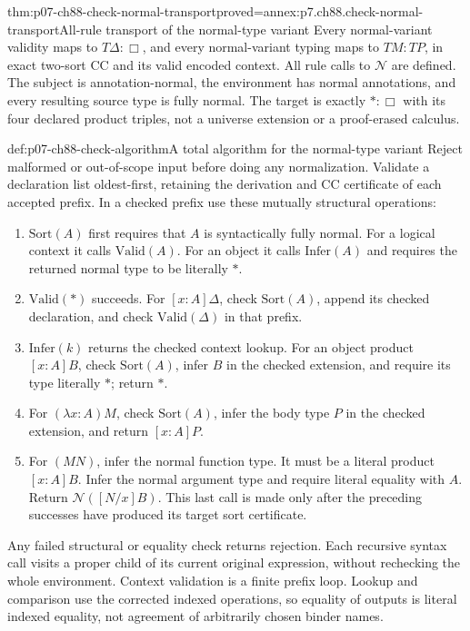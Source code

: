 

\begin{hbtheorem}{thm:p07-ch88-check-normal-transport}{proved=annex:p7.ch88.check-normal-transport}{All-rule transport of the normal-type variant}
Every normal-variant validity maps to \(T\Delta:\Box\), and every
normal-variant typing maps to \(TM:TP\), in exact two-sort CC and its
valid encoded context. All rule calls to \(\mathcal N\) are defined.
The subject is annotation-normal, the environment has normal annotations,
and every resulting source type is fully normal.
The target is exactly \(\ast:\Box\) with its four declared product
triples, not a universe extension or a proof-erased calculus.
\end{hbtheorem}

\begin{hbdefinition}{def:p07-ch88-check-algorithm}{A total algorithm for the normal-type variant}
Reject malformed or out-of-scope input before doing any normalization.
Validate a declaration list oldest-first, retaining the derivation and
CC certificate of each accepted prefix. In a checked prefix use these
mutually structural operations:
\begin{enumerate}
\item \(\mathrm{Sort}(A)\) first requires that \(A\) is syntactically
      fully normal. For a logical context it calls \(\mathrm{Valid}(A)\).
      For an object it calls \(\mathrm{Infer}(A)\) and requires the
      returned normal type to be literally \(\ast\).
\item \(\mathrm{Valid}(\ast)\) succeeds. For \([x:A]\Delta\),
      check \(\mathrm{Sort}(A)\), append its checked declaration,
      and check \(\mathrm{Valid}(\Delta)\) in that prefix.
\item \(\mathrm{Infer}(k)\) returns the checked context lookup.
      For an object product \([x:A]B\), check \(\mathrm{Sort}(A)\),
      infer \(B\) in the checked extension, and require its type
      literally \(\ast\); return \(\ast\).
\item For \((\lambda x:A)M\), check \(\mathrm{Sort}(A)\), infer
      the body type \(P\) in the checked extension, and return
      \([x:A]P\).
\item For \((MN)\), infer the normal function type. It must be a
      literal product \([x:A]B\). Infer the normal argument type
      and require literal equality with \(A\). Return
      \(\mathcal N([N/x]B)\). This last call is made only after the
      preceding successes have produced its target sort certificate.
\end{enumerate}
Any failed structural or equality check returns rejection. Each
recursive syntax call visits a proper child of its current original
expression, without rechecking the whole environment. Context validation
is a finite prefix loop. Lookup and comparison use the corrected indexed
operations, so equality of outputs is literal indexed equality, not
agreement of arbitrarily chosen binder names.
\end{hbdefinition}

